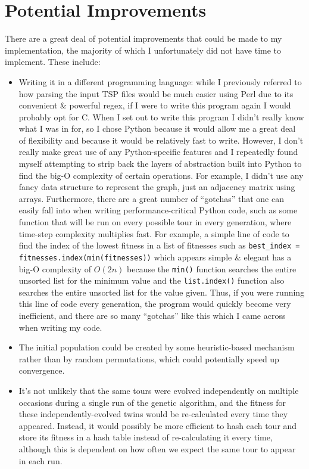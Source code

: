 \documentclass[a4paper]{article}
\begin{document}
\section{Potential Improvements}
There are a great deal of potential improvements that could be made to my implementation, the majority of which I unfortunately did not have time to implement.
These include:
\begin{itemize}
    \item   Writing it in a different programming language: while I previously referred to how parsing the input TSP files would be much easier using Perl due to its convenient \& powerful regex, if I were to write this program again I would probably opt for C.
            When I set out to write this program I didn't really know what I was in for, so I chose Python because it would allow me a great deal of flexibility and because it would be relatively fast to write.
            However, I don't really make great use of any Python-specific features and I repeatedly found myself attempting to strip back the layers of abstraction built into Python to find the big-O complexity of certain operations.
            For example, I didn't use any fancy data structure to represent the graph, just an adjacency matrix using arrays.
            Furthermore, there are a great number of ``gotchas'' that one can easily fall into when writing performance-critical Python code, such as some function that will be run on every possible tour in every generation, where time-step complexity multiplies fast.
            For example, a simple line of code to find the index of the lowest fitness in a list of fitnesses such as \texttt{best_index = fitnesses.index(min(fitnesses))} which appears simple \& elegant has a big-O complexity of $O(2n)$ because the \texttt{min()} function searches the entire unsorted list for the minimum value and the \texttt{list.index()} function also searches the entire unsorted list for the value given.
            Thus, if you were running this line of code every generation, the program would quickly become very inefficient, and there are so many ``gotchas'' like this which I came across when writing my code.

    \item   The initial population could be created by some heuristic-based mechanism rather than by random permutations, which could potentially speed up convergence.

    \item   It's not unlikely that the same tours were evolved independently on multiple occasions during a single run of the genetic algorithm, and the fitness for these independently-evolved twins would be re-calculated every time they appeared. 
            Instead, it would possibly be more efficient to hash each tour and store its fitness in a hash table instead of re-calculating it every time, although this is dependent on how often we expect the same tour to appear in each run.


\end{itemize}
\end{document}
